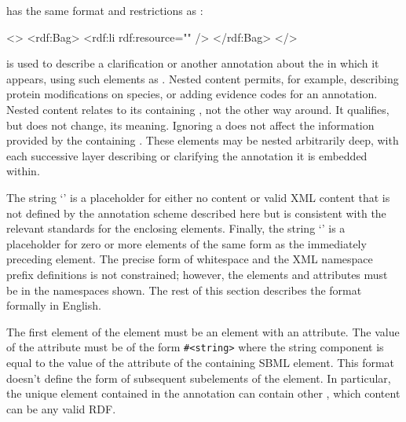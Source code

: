 \begin{blockChanged}
\nestedContent has the same format and restrictions as \relationElement:

\vspace*{-0.75ex}
\begin{example}
  <\relationElementNS>
    <rdf:Bag>
      <rdf:li rdf:resource="\resourceURINS" />
      \moreOfTheSame
      \nestedContent
    </rdf:Bag>
  </\relationElementNS>
\end{example}
\vspace*{-0.75ex}


\nestedContent is used to describe a clarification or another annotation about the \relationElement in which it appears, using such elements as .  Nested content permits, for example, describing protein modifications on species, or adding evidence codes for an annotation.  Nested content relates to its containing \relationElement, not the other way around.  It qualifies, but does not change, its meaning.  Ignoring a \nestedContent does not affect the information provided by the containing \relationElement.  These elements may be nested arbitrarily deep, with each successive layer describing or clarifying the annotation it is embedded within.
\end{blockChanged}

The string
`\otherContent' is a placeholder for either no content or valid
XML content that is not defined by the annotation scheme described
here but is consistent with the relevant standards for the
enclosing elements.  Finally, the string `\moreOfTheSame' is a
placeholder for zero or more elements of the same form as the
immediately preceding element.  The precise form of whitespace and
the XML namespace prefix definitions is not constrained; however,
the elements and attributes must be in the namespaces shown. The
rest of this section describes the format formally in English.

The first element of the  element must be an
 element with an 
attribute. The value of the
 attribute must be of the form
\texttt{\#<string>} where the string component is equal to the
value of the  attribute of the containing SBML element.
This format doesn't define the form of subsequent
subelements of the  element. In particular, the unique  element contained in the annotation can contain other , which content can be any valid RDF.

